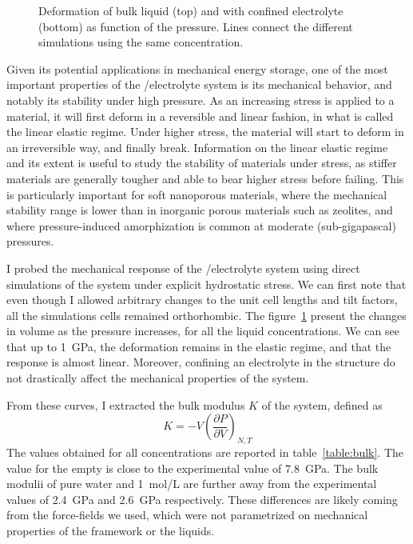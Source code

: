 \documentclass[thesis]{subfiles}
\begin{document}
\begin{figure}[ht]
    \centering
    
    \caption{Deformation of bulk liquid (top) and  with confined electrolyte
    (bottom) as function of the pressure. Lines connect the different simulations
    using the same concentration.}
    \label{fig:licl-zif:pv}
\end{figure}

Given its potential applications in mechanical energy storage, one of the most
important properties of the /electrolyte system is its mechanical behavior,
and notably its stability under high pressure. As an increasing stress is
applied to a material, it will first deform in a reversible and linear fashion,
in what is called the linear elastic regime. Under higher stress, the
material will start to deform in an irreversible way, and finally break.
Information on the linear elastic regime and its extent is useful to study the
stability of materials under stress, as stiffer materials are generally tougher
and able to bear higher stress before failing. This is particularly important
for soft nanoporous materials, where the mechanical stability range is lower
than in inorganic porous materials such as zeolites, and where pressure-induced
amorphization is common at moderate (sub-gigapascal)
pressures\cite{Bennett2011, Cao2012, AOrtiz2013}.

I probed the mechanical response of the /electrolyte system using direct
simulations of the system under explicit hydrostatic stress. We can first note
that even though I allowed arbitrary changes to the unit cell lengths and tilt
factors, all the simulations cells remained orthorhombic. The
figure~\ref{fig:licl-zif:pv} present the changes in volume as the pressure
increases, for all the liquid concentrations. We can see that up to \SI{1}{GPa},
the deformation remains in the elastic regime, and that the response is almost
linear. Moreover, confining an electrolyte in the  structure do not
drastically affect the mechanical properties of the system.

From these curves, I extracted the bulk modulus $K$ of the system, defined as
\[K = -V\left(\frac{\partial P}{\partial V}\right)_{N,T}\]
The values obtained for all concentrations are reported in
table~\ref{table:bulk}. The value for the empty  is close to the
experimental\cite{Tan2012} value of \SI{7.8}{GPa}. The bulk modulii of pure
water and \SI{1}{mol/L} are further away from the experimental
values\cite{Lanman1934} of \SI{2.4}{GPa} and \SI{2.6}{GPa} respectively. These
differences are likely coming from the force-fields we used, which were not
parametrized on mechanical properties of the framework or the liquids.
\end{document}
